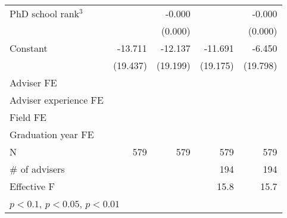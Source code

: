 {\begin{tabular}{l*{4}{D{.}{.}{-1}}}
\addlinespace
PhD school rank$^3$           	&                        	&         -0.000         	&                        	&         -0.000         \\
                              	&                        	&        (0.000)         	&                        	&        (0.000)         \\
\addlinespace
Constant                      	&        -13.711         	&        -12.137         	&        -11.691         	&         -6.450         \\
                              	&       (19.437)         	&       (19.199)         	&       (19.175)         	&       (19.798)         \\
\addlinespace
Adviser FE                    	&     \checkmark         	&     \checkmark         	&     \checkmark         	&     \checkmark         \\
\addlinespace
Adviser experience FE         	&     \checkmark         	&     \checkmark         	&     \checkmark         	&     \checkmark         \\
\addlinespace
Field FE                      	&     \checkmark         	&     \checkmark         	&     \checkmark         	&     \checkmark         \\
\addlinespace
Graduation year FE            	&     \checkmark         	&     \checkmark         	&     \checkmark         	&     \checkmark         \\
\midrule
N                             	&            579         	&            579         	&            579         	&            579         \\
\# of advisers                	&                        	&                        	&            194         	&            194         \\
Effective F                   	&                        	&                        	&           15.8         	&           15.7         \\
\bottomrule
{}\\
\end{tabular}
}
